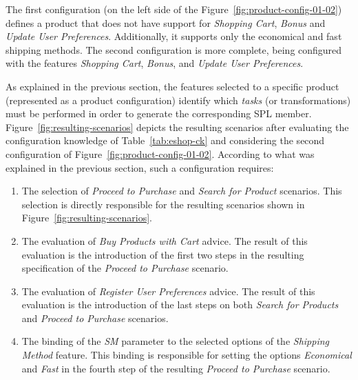\documentclass{sig-alt-full}
\begin{document}
The first configuration (on the left side of the
Figure~\ref{fig:product-config-01-02}) defines a product that does not have support for
\emph{Shopping Cart}, \emph{Bonus} and \emph{Update User Preferences}.
Additionally, it supports only the economical and fast shipping methods. The
second configuration is more complete, being configured with the features
\emph{Shopping Cart}, \emph{Bonus}, and \emph{Update User Preferences}.

As explained in the previous section, the features selected to a specific product
(represented as a product configuration) identify which \emph{tasks} (or
transformations) must be performed in order to generate the corresponding SPL
member. 
Figure~\ref{fig:resulting-scenarios} depicts the resulting scenarios after evaluating the configuration knowledge of
Table~\ref{tab:eshop-ck} and considering the second configuration of
Figure~\ref{fig:product-config-01-02}. According to what was explained in the
previous section, such a configuration requires: 

\begin{enumerate} 
 \item The selection of \emph{Proceed to Purchase} and \emph{Search for Product} scenarios. This selection is directly responsible 
for the resulting scenarios shown in Figure~\ref{fig:resulting-scenarios}. 
  
 \item The evaluation of \emph{Buy Products with Cart} advice. The result of this evaluation is the introduction of the 
first two steps in the resulting specification of the \emph{Proceed to Purchase} scenario. 
 
 \item The evaluation of \emph{Register User Preferences} advice. The result of this evaluation is the introduction of the last steps on both \emph{Search for Products} and \emph{Proceed to
Purchase} scenarios.

 \item The binding of the \emph{SM} parameter to the selected options of the \emph{Shipping Method} feature. This binding is responsible for 
 setting the options \emph{Economical} and \emph{Fast} in the fourth step of the
 resulting \emph{Proceed to Purchase} scenario.

\end{enumerate}
\end{document}

